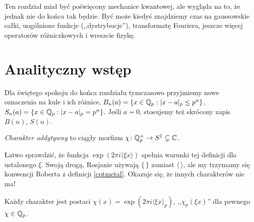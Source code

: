 Ten rozdział miał być poświęcony mechanice kwantowej, ale wygląda na to, że jednak nie do końca tak będzie.
Być może kiedyś znajdziemy czas na gaussowskie całki, uogólnione funkcje (,,dystrybucje''), transformatę Fouriera, jeszcze więcej operatorów różniczkowych i wreszcie fizykę.

\section{Analityczny wstęp}
Dla świętego spokoju do końca rozdziału tymczasowo przyjmiemy nowe oznaczenia na kule i ich różnice, $B_n(a) = \{x \in \mathbb Q_p: |x - a|_p \le p^n\}$, $S_n(a) = \{x \in \mathbb Q_p: |x - a|_p = p^n\}$.
Jeśli $a=0$, stosujemy też skrócony zapis $B(n)$, $S(n)$.

\begin{definicja}
	\emph{Charakter addytywny} to ciągły morfizm $\chi \colon \mathbb Q_p^+ \to S^1 \subsetneq \mathbb C$.
\end{definicja}

Łatwo sprawdzić, że funkcja $\exp (2 \pi i \langle\xi x\rangle)$ spełnia warunki tej definicji dla ustalonego $\xi$. 
Swoją drogą, Rosjanie używają $\{\,\}$ zamiast $\langle \,\rangle$, ale my trzymamy się konwencji Roberta z definicji \ref{cptmetal}.
Okazuje się, że innych charakterów nie ma!

\begin{fakt}
	Każdy charakter jest postaci $\chi(x) = \exp(2 \pi i \langle \xi x \rangle_p)$, ,,$\chi_p(\xi x)$'' dla pewnego $\chi \in \mathbb Q_p$.
\end{fakt}

